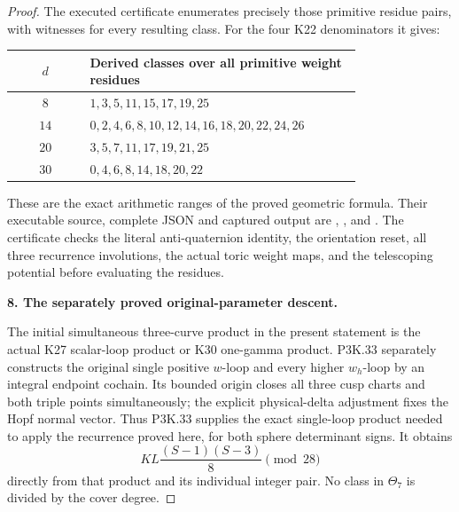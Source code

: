 \begin{proof}
The executed certificate enumerates precisely those
primitive residue pairs, with witnesses for every
resulting class. For the four K22 denominators it gives:

\begin{center}\begin{tabular}{c p{0.78\linewidth}}\toprule
\(d\) & Derived classes over all primitive weight residues\\
\midrule
\(8\) & \(1,3,5,11,15,17,19,25\)\\
\(14\) & \(0,2,4,6,8,10,12,14,16,18,20,22,24,26\)\\
\(20\) & \(3,5,7,11,17,19,21,25\)\\
\(30\) & \(0,4,6,8,14,18,20,22\)\\
\bottomrule\end{tabular}\end{center}

These are the exact arithmetic ranges of the proved
geometric formula. Their executable
source, complete JSON and captured output are
,
,
and .
The certificate checks the literal anti-quaternion
identity, the orientation reset, all three recurrence
involutions, the actual toric weight maps, and the
telescoping potential before evaluating the residues.

\par\medskip\noindent\textbf{8. The separately proved original-parameter descent.}\enspace

The initial simultaneous three-curve product in the present
statement is the actual K27 scalar-loop product or K30
one-gamma product. P3K.33 separately constructs the original
single positive \(w\)-loop and every higher \(w_h\)-loop
by an integral endpoint cochain. Its bounded origin closes
all three cusp charts and both triple points simultaneously;
the explicit physical-delta adjustment fixes the Hopf normal
vector. Thus P3K.33 supplies the exact single-loop product
needed to apply the recurrence proved here, for both sphere
determinant signs. It obtains
\[
             KL\frac{(S-1)(S-3)}8\pmod{28}
\]
directly from that product and its individual integer pair.
No class in \(\Theta_7\) is divided by the cover degree.
\end{proof}
